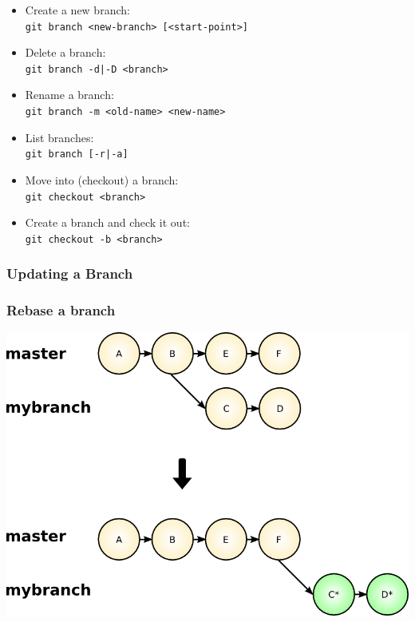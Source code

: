 \begin{frame}
  \frametitle{\insertsubsection}

  \begin{itemize}
    \item Create a new branch:\\
      \texttt{git branch <new-branch> [<start-point>]}
    \item Delete a branch:\\
      \texttt{git branch -d|-D <branch>}
    \item Rename a branch:\\
      \texttt{git branch -m <old-name> <new-name>}
    \item List branches:\\
      \texttt{git branch [-r|-a]}
    \item Move into (checkout) a branch:\\
      \texttt{git checkout <branch>}
    \item Create a branch and check it out:\\
      \texttt{git checkout -b <branch>}
  \end{itemize}

\end{frame}


\subsubsection{Updating a Branch}

\begin{frame}
  \frametitle{Rebase a branch}

  \begin{center}
    \includegraphics[width=1.0\textwidth]{images/git-rebase.png}
  \end{center}

\end{frame}

